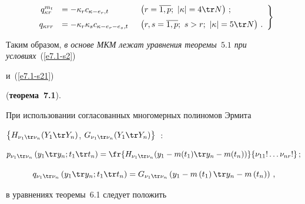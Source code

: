 \noindent

\begin{equation}

  \left.

  \begin{array}{rll}

    q_{\kappa r}^{m_t} &= -\kappa_r c_{\kappa - e_r, t} &\enskip 

    \left(r=\overline{1,p};\ |\kappa | = 4\tr N\right)\,;

\\[6pt]

    q_{\kappa rr}& =-\kappa_r \kappa_s c_{\kappa - e_r - e_s ,t} &\enskip 

    \left(r,s = \overline{1,p};\  s>r;\  |\kappa | = 5\tr N\right)\,.

    \end{array}

    \right\}

    \label{e7.1-s21}

    \end{equation}



Таким образом, \textit{в основе МКМ лежат уравнения теоремы~$5.1$ при условиях}~(\ref{e7.1-s2})

и~(\ref{e7.1-s21})

 (\textbf{теорема~7.1}).

 

 \smallskip



При использовании согласованных многомерных полиномов Эрмита 

$\bigl\{ H_{\nu_1\tr \nu_n} (Y_1\tr Y_n)$, $G_{\nu_1\tr \nu_n} (Y_1\tr Y_n)\bigr\}$~\cite{1-s2, 2-s2}:

    $$

    p_{\nu_1\tr \nu_n}\left (y_1\tr y_n; t_1\tr t_n\right) = 

    \fr{H_{\nu_1\tr \nu_n} (y_1- m(t_1)\tr y_n-m(t_n))}{\nu_{11}!\ldots \nu_{nr}!}\,;

    $$

    $$

    q_{\nu_1\tr \nu_n} \left(y_1\tr y_n; t_1\tr t_n\right) = 

    G_{\nu_1\tr \nu_n} \left(y_1- m\left(t_1\right)\tr y_n-m\left(t_n\right)\right)\,,


    $$

в уравнениях теоремы~6.1 следует положить


